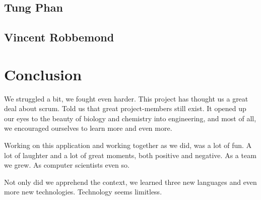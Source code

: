 \documentclass[10pt,a4paper]{report}
\begin{document}
		\subsection{Tung Phan}
			
			\clearpage
		\subsection{Vincent Robbemond}
			
	
	\clearpage	
	\section{Conclusion}
		We struggled a bit, we fought even harder. This project has thought us a great deal about scrum. Told us that great project-members still exist. It opened up our eyes to the beauty of biology and chemistry into engineering, and most of all, we encouraged ourselves to learn more and even more.
		
		Working on this application and working together as we did, was a lot of fun. A lot of laughter and a lot of great moments, both positive and negative. As a team we grew. As computer scientists even so.
		
		Not only did we apprehend the context, we learned three new languages and even more new technologies. Technology seems limitless. 
	
\end{document}
